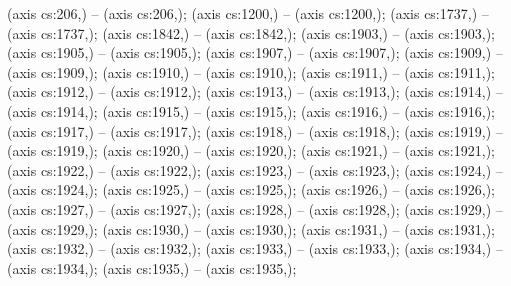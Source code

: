  (axis cs:206,\ymin) -- (axis cs:206,\ymax);
 (axis cs:1200,\ymin) -- (axis cs:1200,\ymax);
 (axis cs:1737,\ymin) -- (axis cs:1737,\ymax);
 (axis cs:1842,\ymin) -- (axis cs:1842,\ymax);
 (axis cs:1903,\ymin) -- (axis cs:1903,\ymax);
 (axis cs:1905,\ymin) -- (axis cs:1905,\ymax);
 (axis cs:1907,\ymin) -- (axis cs:1907,\ymax);
 (axis cs:1909,\ymin) -- (axis cs:1909,\ymax);
 (axis cs:1910,\ymin) -- (axis cs:1910,\ymax);
 (axis cs:1911,\ymin) -- (axis cs:1911,\ymax);
 (axis cs:1912,\ymin) -- (axis cs:1912,\ymax);
 (axis cs:1913,\ymin) -- (axis cs:1913,\ymax);
 (axis cs:1914,\ymin) -- (axis cs:1914,\ymax);
 (axis cs:1915,\ymin) -- (axis cs:1915,\ymax);
 (axis cs:1916,\ymin) -- (axis cs:1916,\ymax);
 (axis cs:1917,\ymin) -- (axis cs:1917,\ymax);
 (axis cs:1918,\ymin) -- (axis cs:1918,\ymax);
 (axis cs:1919,\ymin) -- (axis cs:1919,\ymax);
 (axis cs:1920,\ymin) -- (axis cs:1920,\ymax);
 (axis cs:1921,\ymin) -- (axis cs:1921,\ymax);
 (axis cs:1922,\ymin) -- (axis cs:1922,\ymax);
 (axis cs:1923,\ymin) -- (axis cs:1923,\ymax);
 (axis cs:1924,\ymin) -- (axis cs:1924,\ymax);
 (axis cs:1925,\ymin) -- (axis cs:1925,\ymax);
 (axis cs:1926,\ymin) -- (axis cs:1926,\ymax);
 (axis cs:1927,\ymin) -- (axis cs:1927,\ymax);
 (axis cs:1928,\ymin) -- (axis cs:1928,\ymax);
 (axis cs:1929,\ymin) -- (axis cs:1929,\ymax);
 (axis cs:1930,\ymin) -- (axis cs:1930,\ymax);
 (axis cs:1931,\ymin) -- (axis cs:1931,\ymax);
 (axis cs:1932,\ymin) -- (axis cs:1932,\ymax);
 (axis cs:1933,\ymin) -- (axis cs:1933,\ymax);
 (axis cs:1934,\ymin) -- (axis cs:1934,\ymax);
 (axis cs:1935,\ymin) -- (axis cs:1935,\ymax);
